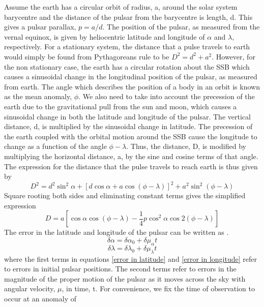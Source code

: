 \documentclass[12pt]{article}
\begin{document}
	Assume the earth has a circular orbit of radius, a, around the solar system barycentre and the distance of the pulsar from the barycentre is length, d. This gives a pulsar parallax, $p=a/d$. The position of the pulsar, as measured from the vernal equinox, is given by heliocentric latitude and longitude of $\alpha$ and $\lambda$, respectively. For a stationary system, the distance that a pulse travels to earth would simply be found from Pythagoreans rule to be $D^2=d^2+a^2$. However, for the non stationary case, the earth has a circular rotation about the SSB which causes a sinusoidal change in the longitudinal position of the pulsar, as measured from earth. The angle which describes the position of a body in an orbit is known as the mean anomaly, $\phi$.  We also need to take into account the precession of the earth due to the gravitational pull from the sun and moon, which causes a sinusoidal change in both the latitude and longitude of the pulsar. The vertical distance, d, is multiplied by the sinusoidal change in latitude. The precession of the earth coupled with the orbital motion around the SSB cause the longitude to change as a function of the angle $\phi-\lambda$. Thus, the distance, D, is modified by multiplying the horizontal distance, a, by the sine and cosine terms of that angle. The expression for the distance that the pulse travels to reach earth is thus given by
	\begin{equation}\label{D eqn}
	D^2=d^2 \sin^2{\alpha}+[d \cos{\alpha}+a \cos(\phi-\lambda)]^2+a^2 \sin^2(\phi-\lambda)
	\end{equation}
	Square rooting both sides and eliminating constant terms gives the simplified expression 
	\begin{equation}\label{simplified D eqn}
	D=a[\cos \alpha \cos(\phi-\lambda)-\frac{1}{4}p\cos^2{\alpha} \cos{2(\phi-\lambda)}]
	\end{equation}
	The error in the latitude and longitude of the pulsar can be written as \cite{blandford1976arrival}.
	\begin{equation}\label{error in latitude}
	\delta\alpha=\delta\alpha_{0}+\delta\mu_{\alpha}t
	\end{equation}
	\begin{equation}\label{error in longitude}
	\delta\lambda=\delta\lambda_{0}+\delta\mu_{\lambda}t
	\end{equation}
	where the first terms in equations \ref{error in latitude} and \ref{error in longitude} refer to errors in initial pulsar positions. The second terms refer to errors in the magnitude of the proper motion of the pulsar as it moves across the sky with angular velocity, $\mu$, in time, t. For convenience, we fix the time of observation to occur at an anomaly of 
\end{document}
